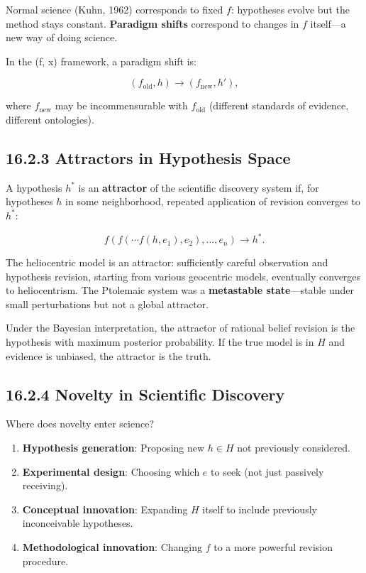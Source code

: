 \begin{observation}
Normal science (Kuhn, 1962) corresponds to fixed $f$: hypotheses evolve but the method stays constant. \textbf{Paradigm shifts} correspond to changes in $f$ itself---a new way of doing science.

In the (f, x) framework, a paradigm shift is:

\[(f_{\text{old}}, h) \to (f_{\text{new}}, h'),\]

where $f_{\text{new}}$ may be incommensurable with $f_{\text{old}}$ (different standards of evidence, different ontologies).
\end{observation}

\subsection{16.2.3 Attractors in Hypothesis Space}

\begin{definition}
A hypothesis $h^*$ is an \textbf{attractor} of the scientific discovery system if, for hypotheses $h$ in some neighborhood, repeated application of revision converges to $h^*$:

\[f(f(\cdots f(h, e_1), e_2), \ldots, e_n) \to h^*.\]
\end{definition}

\begin{example}
The heliocentric model is an attractor: sufficiently careful observation and hypothesis revision, starting from various geocentric models, eventually converges to heliocentrism. The Ptolemaic system was a \textbf{metastable state}---stable under small perturbations but not a global attractor.
\end{example}

\begin{proposition}
Under the Bayesian interpretation, the attractor of rational belief revision is the hypothesis with maximum posterior probability. If the true model is in $H$ and evidence is unbiased, the attractor is the truth.
\end{proposition}

\subsection{16.2.4 Novelty in Scientific Discovery}

Where does novelty enter science?

\begin{enumerate}
\item \textbf{Hypothesis generation}: Proposing new $h \in H$ not previously considered.
\item \textbf{Experimental design}: Choosing which $e$ to seek (not just passively receiving).
\item \textbf{Conceptual innovation}: Expanding $H$ itself to include previously inconceivable hypotheses.
\item \textbf{Methodological innovation}: Changing $f$ to a more powerful revision procedure.
\end{enumerate}

